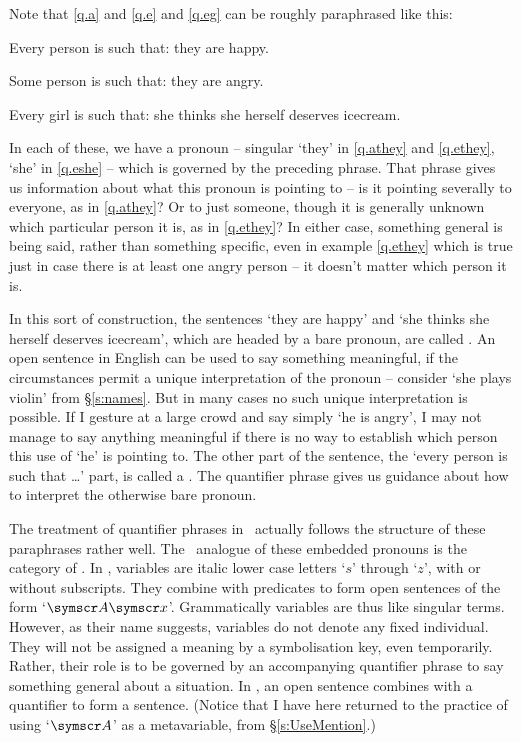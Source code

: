 Note that \ref{q.a} and \ref{q.e} and \ref{q.eg} can be roughly paraphrased like this: \begin{earg}
	\item[\ex{q.athey}] Every person is such that: they are happy.
	\item[\ex{q.ethey}] Some person is such that: they are angry.
	\item[\ex{q.eshe}] Every girl is such that: she thinks she herself deserves icecream.
\end{earg} In each of these, we have a pronoun – singular `they' in \ref{q.athey} and \ref{q.ethey}, `she' in \ref{q.eshe} – which is governed by the preceding phrase. That phrase gives us information about what this pronoun is pointing to – is it pointing severally to everyone, as in \ref{q.athey}? Or to just someone, though it is generally unknown which particular person it is, as in \ref{q.ethey}? In either case, something general is being said, rather than something specific, even in example \ref{q.ethey} which is true just in case there is at least one angry person – it doesn't matter which person it is. 

In this sort of construction, the sentences `they are happy' and `she thinks she herself deserves icecream', which are headed by a bare pronoun, are called . An open sentence in English can be used to say something meaningful, if the circumstances permit a unique interpretation of the pronoun – consider `she plays violin' from §\ref{s:names}. But in many cases no such unique interpretation is possible. If I gesture at a large crowd and say simply `he is angry', I may not manage to say anything meaningful if there is no way to establish which person this use of `he' is pointing to. The other part of the sentence, the `every person is such that …' part, is called a . The quantifier phrase gives us guidance about how to interpret the otherwise bare pronoun. 

The treatment of quantifier phrases in \FOL\ actually follows the structure of these paraphrases rather well. The \FOL\ analogue of these embedded pronouns is the category of . In \FOL, variables are italic lower case letters `$s$' through `$z$', with or without subscripts. They combine with predicates to form open sentences of the form `$\meta{A}\meta{x}$'. Grammatically variables are thus like singular terms. However, as their name suggests, variables do not denote any fixed individual. They will not be assigned a meaning by a symbolisation key, even temporarily. Rather, their role is to be governed by an accompanying quantifier phrase to say something general about a situation. In \FOL, an open sentence combines with a quantifier to form a sentence. (Notice that I have here returned to the practice of using `$\meta{A}$' as a metavariable, from §\ref{s:UseMention}.)


